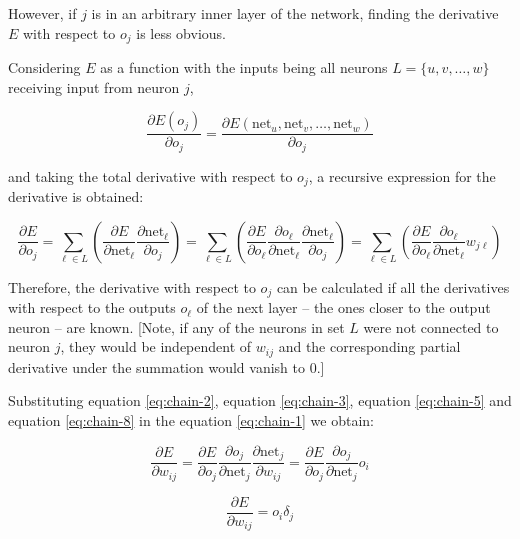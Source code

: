 However, if $j$ is in an arbitrary inner layer of the network, finding the derivative $E$ with respect to $o_{j}$ is less obvious.

Considering $E$ as a function with the inputs being all neurons $L=\{u,v,\dots ,w\}$ receiving input from neuron $j$,

\begin{equation}
    \label{eq:chain-7}
    {\frac {\partial E(o_{j})}{\partial o_{j}}}={\frac {\partial E(\mathrm {net} _{u},{\text{net}}_{v},\dots ,\mathrm {net} _{w})}{\partial o_{j}}}
\end{equation}

and taking the total derivative with respect to $o_j$, a recursive expression for the derivative is obtained:

\begin{equation}
    \label{eq:chain-8}
    {\frac {\partial E}{\partial o_{j}}}=\sum _{\ell \in L}\left({\frac {\partial E}{\partial {\text{net}}_{\ell }}}{\frac {\partial {\text{net}}_{\ell }}{\partial o_{j}}}\right)=\sum _{\ell \in L}\left({\frac {\partial E}{\partial o_{\ell }}}{\frac {\partial o_{\ell }}{\partial {\text{net}}_{\ell }}}{\frac {\partial {\text{net}}_{\ell }}{\partial o_{j}}}\right)=\sum _{\ell \in L}\left({\frac {\partial E}{\partial o_{\ell }}}{\frac {\partial o_{\ell }}{\partial {\text{net}}_{\ell }}}w_{j\ell }\right)
\end{equation}

Therefore, the derivative with respect to $o_j$ can be calculated if all the derivatives with respect to the outputs $o_{\ell }$ of the next layer – the ones closer to the output neuron – are known. [Note, if any of the neurons in set $L$ were not connected to neuron $j$, they would be independent of $w_{ij}$ and the corresponding partial derivative under the summation would vanish to 0.]

Substituting equation \ref{eq:chain-2}, equation \ref{eq:chain-3}, equation \ref{eq:chain-5} and equation \ref{eq:chain-8} in the equation \ref{eq:chain-1} we obtain:

\begin{equation}
    \label{eq:chain-9}
    {\frac {\partial E}{\partial w_{ij}}}={\frac {\partial E}{\partial o_{j}}}{\frac {\partial o_{j}}{\partial {\text{net}}_{j}}}{\frac {\partial {\text{net}}_{j}}{\partial w_{ij}}}={\frac {\partial E}{\partial o_{j}}}{\frac {\partial o_{j}}{\partial {\text{net}}_{j}}}o_{i}
\end{equation}

\begin{equation}
    \label{eq:chain-10}
    {\frac {\partial E}{\partial w_{ij}}}=o_{i}\delta _{j}
\end{equation}

